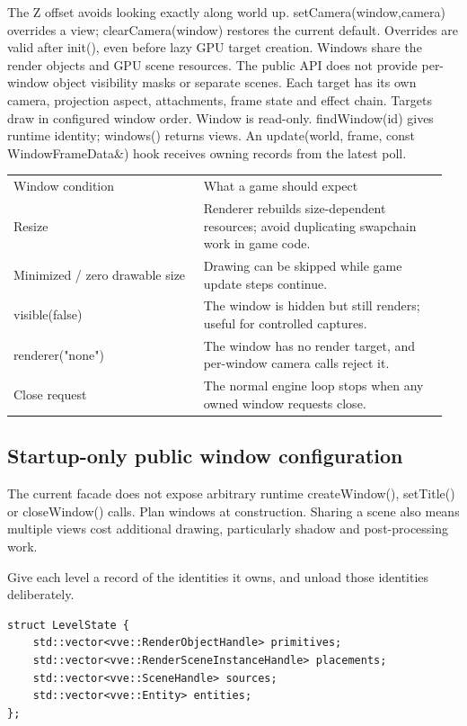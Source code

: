 \documentclass[11pt,a4paper]{article}
\begin{document}
The Z offset avoids looking exactly along world up. setCamera(window,camera) overrides a view; clearCamera(window) restores the current default. Overrides are valid after init(), even before lazy GPU target creation. Windows share the render objects and GPU scene resources. The public API does not provide per-window object visibility masks or separate scenes. Each target has its own camera, projection aspect, attachments, frame state and effect chain. Targets draw in configured window order. Window is read-only. findWindow(id) gives runtime identity; windows() returns views. An update(world, frame, const WindowFrameData\&) hook receives owning records from the latest poll.

{\small
\begin{longtable}{@{}p{0.42\linewidth}p{0.54\linewidth}@{}}
Window condition & What a game should expect \\
Resize & Renderer rebuilds size-dependent resources; avoid duplicating swapchain work in game code. \\
Minimized / zero drawable size & Drawing can be skipped while game update steps continue. \\
visible(false) & The window is hidden but still renders; useful for controlled captures. \\
renderer("none") & The window has no render target, and per-window camera calls reject it. \\
Close request & The normal engine loop stops when any owned window requests close. \\
\end{longtable}
}

\subsection*{Startup-only public window configuration}
The current facade does not expose arbitrary runtime createWindow(), setTitle() or closeWindow() calls. Plan windows at construction. Sharing a scene also means multiple views cost additional drawing, particularly shadow and post-processing work.

\label{core-71}
Give each level a record of the identities it owns, and unload those identities deliberately.

\begin{lstlisting}[language={}]
struct LevelState {
    std::vector<vve::RenderObjectHandle> primitives;
    std::vector<vve::RenderSceneInstanceHandle> placements;
    std::vector<vve::SceneHandle> sources;
    std::vector<vve::Entity> entities;
};
\end{lstlisting}
\end{document}
